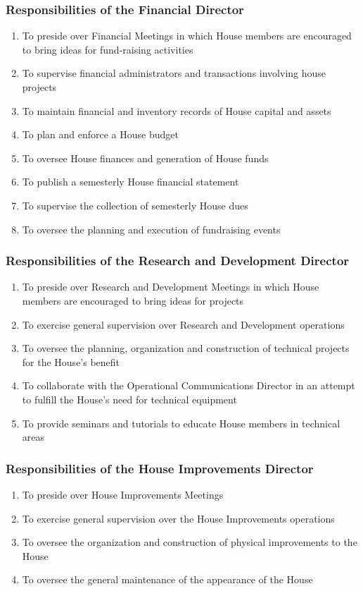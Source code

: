 \documentclass{article}
\newcommand{\asubsection}[1]{\subsubsection{#1} \label{#1}}
\begin{document}
\asubsection{Responsibilities of the Financial Director}
\begin{enumerate}
	\item To preside over Financial Meetings in which House members are encouraged to bring ideas for fund-raising activities
	\item To supervise financial administrators and transactions involving house projects
	\item To maintain financial and inventory records of House capital and assets
	\item To plan and enforce a House budget
	\item To oversee House finances and generation of House funds
	\item To publish a semesterly House financial statement
	\item To supervise the collection of semesterly House dues
	\item To oversee the planning and execution of fundraising events
\end{enumerate}

\asubsection{Responsibilities of the Research and Development Director}
\begin{enumerate}
	\item To preside over Research and Development Meetings in which House members are encouraged to bring ideas for projects
	\item To exercise general supervision over Research and Development operations
	\item To oversee the planning, organization and construction of technical projects for the House's benefit
	\item To collaborate with the Operational Communications Director in an attempt to fulfill the House's need for technical equipment
	\item To provide seminars and tutorials to educate House members in technical areas
\end{enumerate}

\asubsection{Responsibilities of the House Improvements Director}
\begin{enumerate}
	\item To preside over House Improvements Meetings
	\item To exercise general supervision over the House Improvements operations
	\item To oversee the organization and construction of physical improvements to the House
	\item To oversee the general maintenance of the appearance of the House
\end{enumerate}
\end{document}
